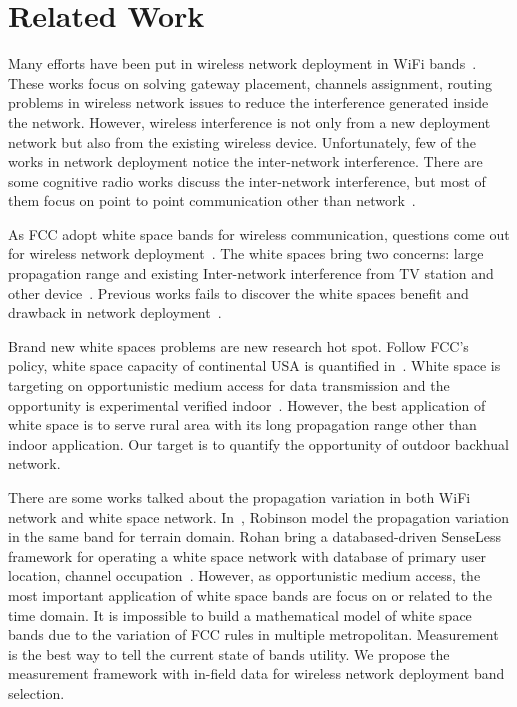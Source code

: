 \section{Related Work}
\label{sec:related}

Many efforts have been put in wireless network deployment in WiFi bands~\cite{he2008optimizing,ramachandran2006interference,akyildiz2006next}.
These works focus on solving gateway placement, channels assignment, routing 
problems in wireless network issues to reduce the interference generated inside the network.
However, wireless interference is not only from a new deployment network but also from the
existing wireless device. Unfortunately, few of the works in network deployment notice the 
inter-network interference. There are some cognitive radio works discuss the inter-network
interference, but most of them focus on point to point communication other than network~\cite{cabric2004implementation}.

As FCC adopt white space bands for wireless communication, questions come out 
for wireless network deployment~\cite{fccwhitespace}. The white spaces bring two
concerns: large propagation range and existing Inter-network interference from 
TV station and other device~\cite{cui2013leveraging,bahl2009white}.
Previous works fails to discover the white spaces benefit and drawback in network deployment~\cite{akyildiz2005wireless}.

Brand new white spaces problems are new research hot spot. Follow FCC's policy, white space capacity 
of  continental USA is quantified in~\cite{harrison2010much}. White space is targeting on opportunistic 
medium access for data transmission and the opportunity is experimental verified indoor~\cite{obregon2010experimental}.
However, the best application of white space is to serve rural area with its long propagation range
other than indoor application. Our target is to quantify the opportunity of outdoor backhual network.

There are some works talked about the propagation variation in both WiFi network and white space network.
In~\cite{robinson2010deploying}, Robinson model the propagation variation in the same band for terrain 
domain. Rohan bring a databased-driven SenseLess framework for operating a white space network with 
database of primary user location, channel occupation~\cite{murty2012senseless}. 
However, as opportunistic medium access, the most important application of white space bands are 
focus on or related to the time domain. It is impossible to build a mathematical model of white 
space bands due to the variation of FCC rules 
in multiple metropolitan. Measurement is the best way to tell the current state of bands utility.
We propose the measurement framework with in-field data for wireless network deployment band selection.


 


